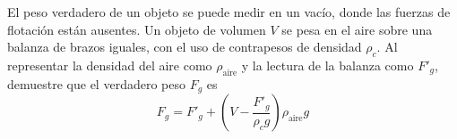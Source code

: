 \item El peso verdadero de un objeto se puede medir en un vacío, donde las fuerzas de flotación están ausentes. Un objeto de volumen $V$ se pesa en el aire sobre una balanza de brazos iguales, con el uso de contrapesos de densidad $\rho_c$. Al representar la densidad del aire como $\rho_{\text{aire}}$ y la lectura de la balanza como $F'_g$, demuestre que el verdadero peso $F_g$ es
$$ F_g = F'_g + \left( V - \frac{F'_g}{\rho_c g} \right) \rho_{\text{aire}} g $$

